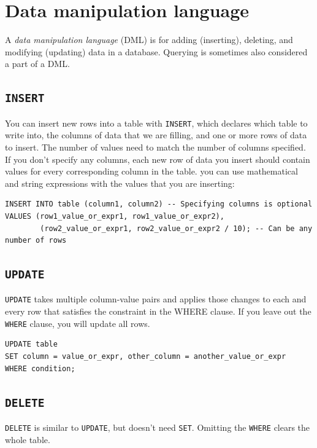 \documentclass[table, xcdraw]{article}%
\begin{document}
\section{Data manipulation language}

A \emph{data manipulation language} (DML) is for adding (inserting), deleting, and modifying (updating) data in a database. Querying is sometimes also considered a part of a DML.

\subsection{\texttt{INSERT}}

You can insert new rows into a table with \texttt{INSERT}, which declares which table to write into, the columns of data that we are filling, and one or more rows of data to insert. The number of values need to match the number of columns specified. If you don't specify any columns, each new row of data you insert should contain values for every corresponding column in the table. you can use mathematical and string expressions with the values that you are inserting:

\begin{verbatim}
INSERT INTO table (column1, column2) -- Specifying columns is optional
VALUES (row1_value_or_expr1, row1_value_or_expr2),
        (row2_value_or_expr1, row2_value_or_expr2 / 10); -- Can be any number of rows
\end{verbatim}

\subsection{\texttt{UPDATE}}

\texttt{UPDATE} takes multiple column-value pairs and applies those changes to each and every row that satisfies the constraint in the WHERE clause. If you leave out the \texttt{WHERE} clause, you will update all rows.

\begin{verbatim}
UPDATE table
SET column = value_or_expr, other_column = another_value_or_expr
WHERE condition;
\end{verbatim}

\subsection{\texttt{DELETE}}

\texttt{DELETE} is similar to \texttt{UPDATE}, but doesn't need \texttt{SET}. Omitting the \texttt{WHERE} clears the whole table.
\end{document}
